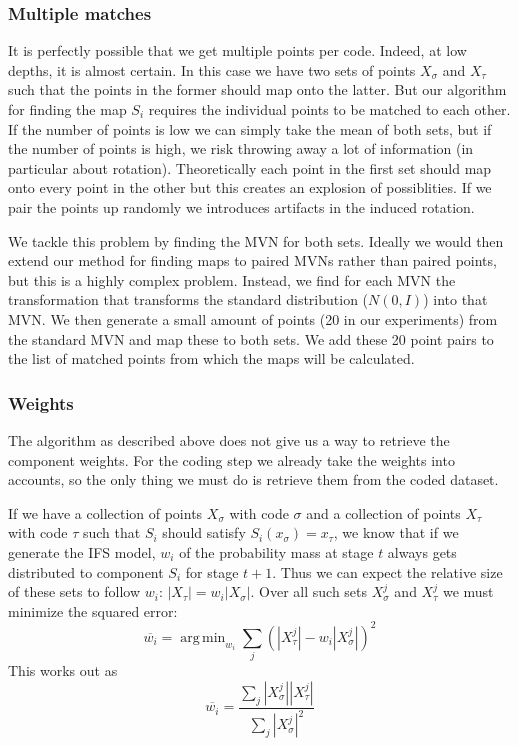\documentclass[10pt]{article}
\theoremstyle{definition}
\DeclareMathOperator*{\argmin}{arg\,min}
\begin{document}

\subsubsection{Multiple matches}

It is perfectly possible that we get multiple points per code. Indeed, at low depths, it is almost certain. In this case we have two sets of points $X_\sigma$ and $X_\tau$ such that the points in the former should map onto the latter. But our algorithm for finding the map $S_i$ requires the individual points to be matched to each other. If the number of points is low we can simply take the mean of both sets, but if the number of points is high, we risk throwing away a lot of information (in particular about rotation). Theoretically each point in the first set should map onto every point in the other but this creates an explosion of possiblities. If we pair the points up randomly we introduces artifacts in the induced rotation.

We tackle this problem by finding the MVN for both sets. Ideally we would then extend our method for finding maps to paired MVNs rather than paired points, but this is a highly complex problem. Instead, we find for each MVN the transformation that transforms the standard distribution ($N(0, I)$) into that MVN. We then generate a small amount of points (20 in our experiments) from the standard MVN and map these to both sets. We add these 20 point pairs to the list of matched points from which the maps will be calculated. 

\subsubsection{Weights}

The algorithm as described above does not give us a way to retrieve the component weights. For the coding step we already take the weights into accounts, so the only thing we must do is retrieve them from the coded dataset. 

If we have a collection of points $X_\sigma$ with code $\sigma$ and a collection of points $X_\tau$ with code $\tau$ such that $S_i$ should satisfy $S_i(x_\sigma) = x_\tau$, we know that if we generate the IFS model, $w_i$ of the probability mass at stage $t$ always gets distributed to component $S_i$ for stage $t + 1$. Thus we can expect the relative size of these sets to follow $w_i$: $|X_\tau| = w_i |X_\sigma|$. Over all such sets $X_\sigma^j$ and $X_\tau^j$ we must minimize the squared error:
\[
\overline{w_i} = \argmin_{w_i} \sum_{j} \left( |X_\tau^j| - w_i |X_\sigma^j| \right)^2
\]
This works out as 
\[
\overline{w_i} = \frac{\sum_{j}|X_\sigma^j||X_\tau^j|}{\sum_{j}|X_\sigma^j|^2}
\]
\end{document}

